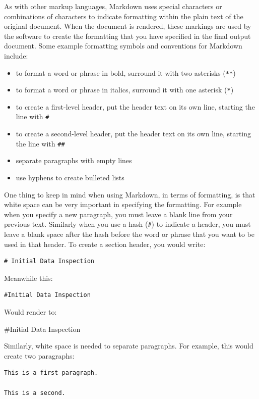 \documentclass[]{tufte-book}
\providecommand{\tightlist}{%
  \setlength{\itemsep}{0pt}\setlength{\parskip}{0pt}}
\begin{document}
As with other markup languages, Markdown uses special characters or combinations of characters to indicate formatting within the plain text of the original document. When the document is rendered, these markings are used by the software to create the formatting that you have specified in the final output document. Some example formatting symbols and conventions for Markdown include:

\begin{itemize}
\tightlist
\item
  to format a word or phrase in bold, surround it with two asterisks (\texttt{**})
\item
  to format a word or phrase in italics, surround it with one asterisk (\texttt{*})
\item
  to create a first-level header, put the header text on its own line, starting the line with \texttt{\#}
\item
  to create a second-level header, put the header text on its own line, starting the line with \texttt{\#\#}
\item
  separate paragraphs with empty lines
\item
  use hyphens to create bulleted lists
\end{itemize}

One thing to keep in mind when using Markdown, in terms of formatting, is that
white space can be very important in specifying the formatting. For example when
you specify a new paragraph, you must leave a blank line from your previous
text. Similarly when you use a hash (\texttt{\#}) to indicate a header, you must leave a
blank space after the hash before the word or phrase that you want to be used in
that header. To create a section header, you would write:

\begin{verbatim}
# Initial Data Inspection
\end{verbatim}

Meanwhile this:

\begin{verbatim}
#Initial Data Inspection
\end{verbatim}

Would render to:

\#Initial Data Inspection

Similarly, white space is needed to separate paragraphs. For example, this would create two paragraphs:

\begin{verbatim}
This is a first paragraph. 

This is a second.
\end{verbatim}
\end{document}
